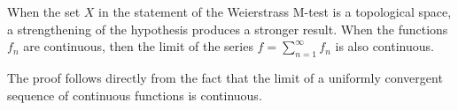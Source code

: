 \documentclass[12pt]{article}
\begin{document}
When the set $X$ in the statement of the Weierstrass M-test is a topological space, a strengthening of the hypothesis produces a stronger result. When the functions $f_n$ are continuous, then the limit of the series $f = \sum_{n=1}^\infty f_n$ is also continuous.

The proof follows directly from the fact that the limit of a uniformly convergent sequence of continuous functions is continuous.
\end{document}
